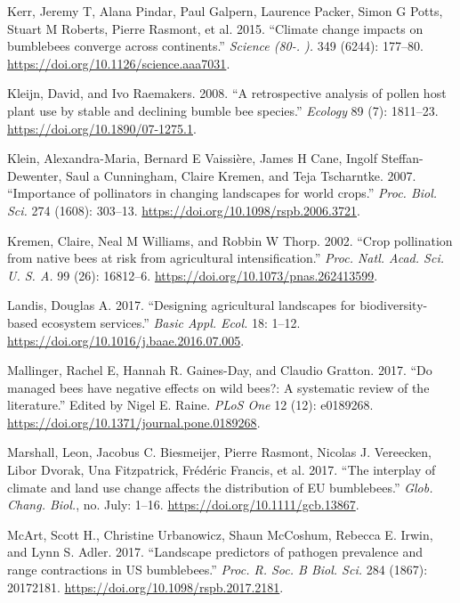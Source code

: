 \documentclass[11pt,]{article}
\begin{document}
\leavevmode\hypertarget{ref-Kerr2015}{}%
Kerr, Jeremy T, Alana Pindar, Paul Galpern, Laurence Packer, Simon G
Potts, Stuart M Roberts, Pierre Rasmont, et al. 2015. ``Climate change
impacts on bumblebees converge across continents.'' \emph{Science (80-.
).} 349 (6244): 177--80. \url{https://doi.org/10.1126/science.aaa7031}.

\leavevmode\hypertarget{ref-Kleijn2008}{}%
Kleijn, David, and Ivo Raemakers. 2008. ``A retrospective analysis of
pollen host plant use by stable and declining bumble bee species.''
\emph{Ecology} 89 (7): 1811--23.
\url{https://doi.org/10.1890/07-1275.1}.

\leavevmode\hypertarget{ref-Klein2007g}{}%
Klein, Alexandra-Maria, Bernard E Vaissière, James H Cane, Ingolf
Steffan-Dewenter, Saul a Cunningham, Claire Kremen, and Teja Tscharntke.
2007. ``Importance of pollinators in changing landscapes for world
crops.'' \emph{Proc. Biol. Sci.} 274 (1608): 303--13.
\url{https://doi.org/10.1098/rspb.2006.3721}.

\leavevmode\hypertarget{ref-Kremen2002}{}%
Kremen, Claire, Neal M Williams, and Robbin W Thorp. 2002. ``Crop
pollination from native bees at risk from agricultural
intensification.'' \emph{Proc. Natl. Acad. Sci. U. S. A.} 99 (26):
16812--6. \url{https://doi.org/10.1073/pnas.262413599}.

\leavevmode\hypertarget{ref-Landis2017}{}%
Landis, Douglas A. 2017. ``Designing agricultural landscapes for
biodiversity-based ecosystem services.'' \emph{Basic Appl. Ecol.} 18:
1--12. \url{https://doi.org/10.1016/j.baae.2016.07.005}.

\leavevmode\hypertarget{ref-Mallinger2017a}{}%
Mallinger, Rachel E, Hannah R. Gaines-Day, and Claudio Gratton. 2017.
``Do managed bees have negative effects on wild bees?: A systematic
review of the literature.'' Edited by Nigel E. Raine. \emph{PLoS One} 12
(12): e0189268. \url{https://doi.org/10.1371/journal.pone.0189268}.

\leavevmode\hypertarget{ref-Marshall2017}{}%
Marshall, Leon, Jacobus C. Biesmeijer, Pierre Rasmont, Nicolas J.
Vereecken, Libor Dvorak, Una Fitzpatrick, Frédéric Francis, et al. 2017.
``The interplay of climate and land use change affects the distribution
of EU bumblebees.'' \emph{Glob. Chang. Biol.}, no. July: 1--16.
\url{https://doi.org/10.1111/gcb.13867}.

\leavevmode\hypertarget{ref-McArt2017}{}%
McArt, Scott H., Christine Urbanowicz, Shaun McCoshum, Rebecca E. Irwin,
and Lynn S. Adler. 2017. ``Landscape predictors of pathogen prevalence
and range contractions in US bumblebees.'' \emph{Proc. R. Soc. B Biol.
Sci.} 284 (1867): 20172181.
\url{https://doi.org/10.1098/rspb.2017.2181}.
\end{document}
